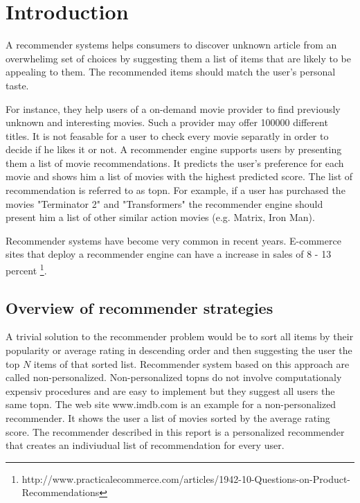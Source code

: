 \section{Introduction}
\label{sec:intro}

A recommender systems helps consumers to discover unknown article from an overwhelimg set of choices by suggesting them a list of items that are likely to be appealing to them. The recommended items should match the user's personal taste.

For instance, they help users of a on-demand movie provider to find previously unknown and interesting movies. Such a provider may offer 100000 different titles. It is not feasable for a user to check every movie separatly in order to decide if he likes it or not. A recommender engine supports users by presenting them a list of movie recommendations. It predicts the user's preference for each movie and shows him a list of movies with the highest predicted score. The list of recommendation is referred to as \gls{topn}. For example, if a user has purchased the movies "Terminator 2" and "Transformers" the recommender engine should present him a list of other similar action movies (e.g. Matrix, Iron Man). 
 
Recommender systems have become very common in recent years. E-commerce sites that deploy a recommender engine can have a increase in sales of 8 - 13 percent \footnote{http://www.practicalecommerce.com/articles/1942-10-Questions-on-Product-Recommendations}.

\subsection{Overview of recommender strategies}
\label{sec:strategies}

A trivial solution to the recommender problem would be to sort all items by their popularity or average rating in descending order and then suggesting the user the top $N$ items of that sorted list. Recommender system based on this approach are called non-personalized. Non-personalized \glspl{topn} do not involve computationaly expensiv procedures and are easy to implement but they suggest all users the same \gls{topn}. The web site www.imdb.com is an example for a non-personalized recommender. It shows the user a list of movies sorted by the average rating score.
 The recommender described in this report is a personalized recommender that creates an indiviudual list of recommendation for every user.


